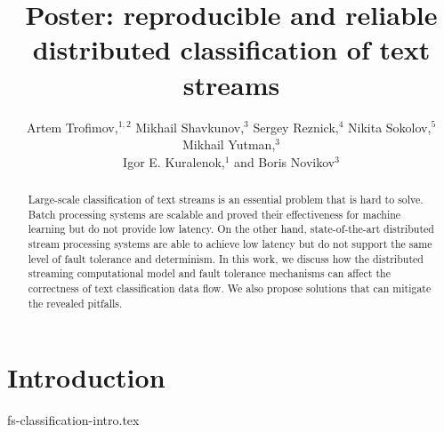 \documentclass[sigconf]{acmart}
\theoremstyle{remark}
\begin{document}

\title {Poster: reproducible and reliable distributed classification of text streams}

\author{Artem Trofimov,$^ {1,2}$    Mikhail Shavkunov,$^3$    Sergey Reznick,$^4$     Nikita Sokolov,$^{5}$   Mikhail Yutman,$^3$ \\   Igor E. Kuralenok,$^1$    and  Boris Novikov$^ {3}$ }

\begin{abstract}

Large-scale classification of text streams is an essential problem that is hard to solve. Batch processing systems are scalable and proved their effectiveness for machine learning but do not provide low latency. On the other hand, state-of-the-art distributed stream processing systems are able to achieve low latency but do not support the same level of fault tolerance and determinism. In this work, we discuss how the distributed streaming computational model and fault tolerance mechanisms can affect the correctness of text classification data flow. We also propose solutions that can mitigate the revealed pitfalls.

\end{abstract}


\maketitle

\thispagestyle{empty}

\section {Introduction}
 {fs-classification-intro.tex}
\end{document}
